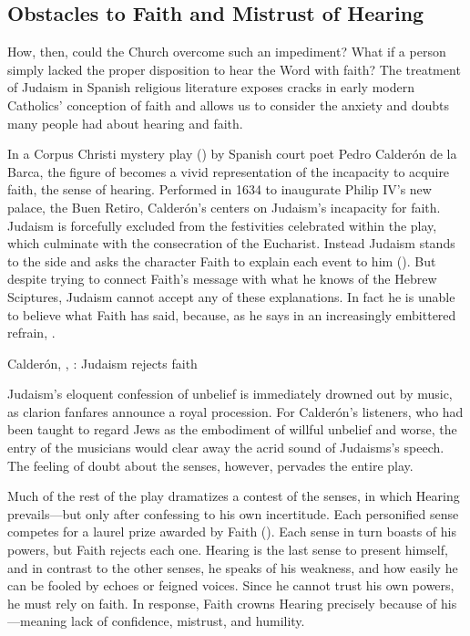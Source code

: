 \subsection{Obstacles to Faith and Mistrust of Hearing}

How, then, could the Church overcome such an impediment?
What if a person simply lacked the proper disposition to hear the Word with 
faith?
The treatment of Judaism in Spanish religious literature exposes cracks in 
early modern Catholics' conception of faith and allows us to consider the 
anxiety and doubts many people had about hearing and faith.

In a Corpus Christi mystery play () by Spanish court 
poet Pedro Calderón de la Barca, the figure of  becomes a vivid 
representation of the incapacity to acquire faith,  the sense of 
hearing.
Performed in 1634 to inaugurate Philip IV's new palace, the Buen Retiro, 
Calderón's  centers on Judaism's 
incapacity for faith.%
    \Autocites{Calderon:Retiro}
Judaism is forcefully excluded from the festivities celebrated within the play, 
which culminate with the consecration of the Eucharist.
Instead Judaism stands to the side and asks the character Faith to explain each 
event to him ().
But despite trying to connect Faith's message with what he knows of the Hebrew 
Sciptures, Judaism cannot accept any of these explanations.
In fact he is unable to believe what Faith has said, because, as he says in an 
increasingly embittered refrain, .

\begin{expoem}
    \caption{Calderón, , 
    : Judaism rejects faith}
    \label{expoem:Calderon-Retiro-Judaismo}
\end{expoem}

Judaism's eloquent confession of unbelief is immediately drowned out by music, 
as clarion fanfares announce a royal procession.
For Calderón's listeners, who had been taught to regard Jews as the embodiment 
of willful unbelief and worse, the entry of the musicians would clear away the 
acrid sound of Judaisms's speech.
The feeling of doubt about the senses, however, pervades the entire play.

Much of the rest of the play dramatizes a contest of the senses, in which 
Hearing prevails---but only after confessing to his own incertitude.
Each personified sense competes for a laurel prize awarded by Faith 
().
Each sense in turn boasts of his powers, but Faith rejects each one.
Hearing is the last sense to present himself, and in contrast to the other 
senses, he speaks of his weakness, and how easily he can be fooled by echoes or 
feigned voices.
Since he cannot trust his own powers, he must rely on faith.
In response, Faith crowns Hearing precisely because of his 
---meaning lack of confidence, mistrust, and humility.

